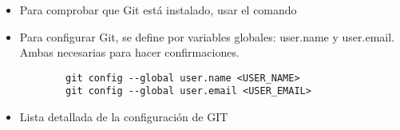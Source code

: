 \begin{itemize}
    \item Para comprobar que Git está instalado, usar el comando 
    \item Para configurar Git, se define por variables globales: user.name y user.email. Ambas necesarias para hacer confirmaciones.
    \begin{verbatim}
        git config --global user.name <USER_NAME>
        git config --global user.email <USER_EMAIL>
    \end{verbatim}    
    \item Lista detallada de la configuración de GIT 
\end{itemize}


